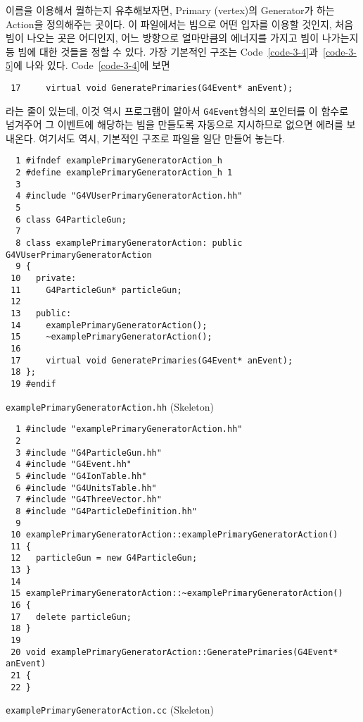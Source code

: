 이름을 이용해서 뭘하는지 유추해보자면, Primary (vertex)의 Generator가 하는
Action을 정의해주는 곳이다. 이 파일에서는 빔으로 어떤 입자를 이용할 것인지,
처음 빔이 나오는 곳은 어디인지, 어느 방향으로 얼마만큼의 에너지를 가지고 빔이
나가는지 등 빔에 대한 것들을 정할 수 있다. 가장 기본적인 구조는
Code~\ref{code-3-4}과~\ref{code-3-5}에 나와 있다. Code~\ref{code-3-4}에 보면
\begin{pc}
\begin{lstlisting}
 17     virtual void GeneratePrimaries(G4Event* anEvent);
\end{lstlisting}
\end{pc}
라는 줄이 있는데, 이것 역시 프로그램이 알아서 \texttt{G4Event}형식의 포인터를
이 함수로 넘겨주어 그 이벤트에 해당하는 빔을 만들도록 자동으로 지시하므로
없으면 에러를 보내온다. 여기서도 역시, 기본적인 구조로 파일을 일단 만들어 놓는다.

\begin{code}[p]
\begin{lstlisting}
  1 #ifndef examplePrimaryGeneratorAction_h
  2 #define examplePrimaryGeneratorAction_h 1
  3 
  4 #include "G4VUserPrimaryGeneratorAction.hh"
  5 
  6 class G4ParticleGun;
  7 
  8 class examplePrimaryGeneratorAction: public G4VUserPrimaryGeneratorAction
  9 {
 10   private:
 11     G4ParticleGun* particleGun;
 12 
 13   public:
 14     examplePrimaryGeneratorAction();
 15     ~examplePrimaryGeneratorAction();
 16 
 17     virtual void GeneratePrimaries(G4Event* anEvent);
 18 };
 19 #endif
\end{lstlisting}
\caption{\texttt{examplePrimaryGeneratorAction.hh} (Skeleton) \label{code-3-4}}
\end{code}

\begin{code}[p]
\begin{lstlisting}
  1 #include "examplePrimaryGeneratorAction.hh"
  2 
  3 #include "G4ParticleGun.hh"
  4 #include "G4Event.hh"
  5 #include "G4IonTable.hh"
  6 #include "G4UnitsTable.hh"
  7 #include "G4ThreeVector.hh"
  8 #include "G4ParticleDefinition.hh"
  9 
 10 examplePrimaryGeneratorAction::examplePrimaryGeneratorAction()
 11 {
 12   particleGun = new G4ParticleGun;
 13 }
 14 
 15 examplePrimaryGeneratorAction::~examplePrimaryGeneratorAction()
 16 {
 17   delete particleGun;
 18 }
 19 
 20 void examplePrimaryGeneratorAction::GeneratePrimaries(G4Event* anEvent)
 21 {
 22 }
\end{lstlisting}
\caption{\texttt{examplePrimaryGeneratorAction.cc} (Skeleton) \label{code-3-5}}
\end{code}

